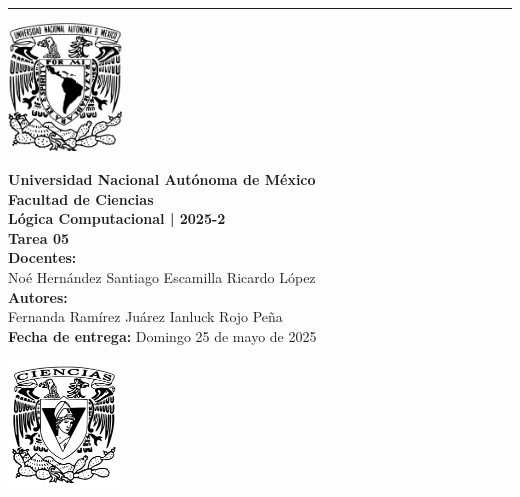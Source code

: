 \documentclass[12pt,letterpaper]{article}
\begin{document}
\hrule height 0.1pt
\bigskip

\begin{center}
  \begin{minipage}{3cm}
    \begin{center}
      \includegraphics[height=3.4cm]{../unam_logo.png}
    \end{center}
  \end{minipage}\hfill
  \begin{minipage}{10cm}
    \begin{center}
      \textbf{\Large Universidad Nacional Autónoma de México}\\[0.2cm]
      \textbf{\large Facultad de Ciencias}\\[0.2cm]
      \textbf{Lógica Computacional | 2025-2}\\[0.4cm]
      \textbf{\Large Tarea 05}\\[0.1cm]
      \textbf{Docentes:}\\
      Noé Hernández \hspace{0.9em} Santiago Escamilla \hspace{0.9em} Ricardo López\\[0.3cm]
      \textbf{Autores:}\\
      Fernanda Ramírez Juárez \quad Ianluck Rojo Peña\\[0.3cm]
      \textbf{Fecha de entrega:} Domingo 25 de mayo de 2025
    \end{center}
  \end{minipage}\hfill
  \begin{minipage}{3cm}
    \begin{center}
      \includegraphics[height=3.4cm]{../fc_logo.png}
    \end{center}
  \end{minipage}
\end{center}
\end{document}
